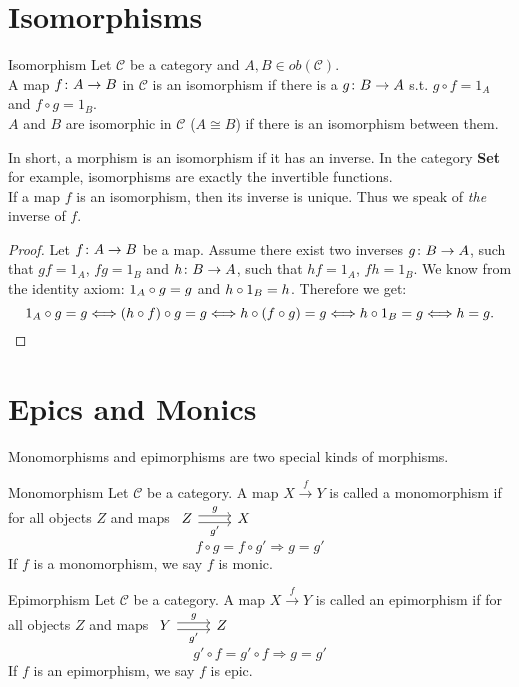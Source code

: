 \section {Isomorphisms}
\begin{definition}{Isomorphism}
  Let $\mathscr{C}$ be a category and $A, B \in ob(\mathscr{C})$. \\
  A map $f \from A \to B$ in $\mathscr{C}$ is an isomorphism if there is a $g \from B \to A$ s.t. $g \circ f = 1_A$ and $f \circ g = 1_B$. \\
  $A$ and $B$ are isomorphic in $\mathscr{C}$ ($A \cong B$) if there is an isomorphism between them.
\end{definition}

In short, a morphism is an isomorphism if it has an inverse. In the category \textbf{Set} for example,
isomorphisms are exactly the invertible functions.\\
If a map $f$ is an isomorphism, then its inverse is unique. Thus we speak of
\emph{the} inverse of $f$.

\begin{proof}
  Let $f \from A \to B$ be a map.
  Assume there exist two inverses $g \from B \to A$, such that $gf = 1_A$, $fg = 1_B$ and \mbox{$h \from B \to A$}, such that $hf = 1_A$, $fh = 1_B$.
  We know from the identity axiom: $1_A \mathbin{\circ} g = g$ and $h \mathbin{\circ} 1_B = h$. Therefore we get:
 \[  1_A \mathbin{\circ} g = g \Longleftrightarrow (h \mathbin{\circ} f) \mathbin{\circ} g = g \Longleftrightarrow h \mathbin{\circ} (f \mathbin{\circ} g) = g \Longleftrightarrow h \mathbin{\circ} 1_B = g \Longleftrightarrow h=g. \]
\end{proof}

\section {Epics and Monics}

Monomorphisms and epimorphisms are two special kinds of morphisms.

\begin{definition}{Monomorphism}
  Let $\mathscr{C}$ be a category. A map $X \overset{f}{\to} Y$ is called a monomorphism if for all objects $Z$ and maps
  $
  \begin{tikzcd}
    Z \arrow[r,shift left, "g"] \arrow[r,shift right,swap,"g'"] & X
  \end{tikzcd}
  $
  \[
    f \circ g = f \circ g' \Rightarrow g = g'
  \]
  If $f$ is a monomorphism, we say $f$ is monic.
\end{definition}

\begin{definition}{Epimorphism}
  Let $\mathscr{C}$ be a category. A map $X \overset{f}{\to} Y$ is called an epimorphism if for all objects $Z$ and maps
  $
  \begin{tikzcd}
    Y \arrow[r,shift left, "g"] \arrow[r,shift right,swap,"g'"] & Z
  \end{tikzcd}
  $
  \[
    g' \circ f = g' \circ f \Rightarrow g = g'
  \]
  If $f$ is an epimorphism, we say $f$ is epic.
\end{definition}

